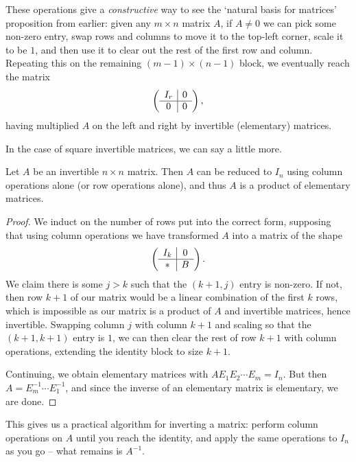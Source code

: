 \documentclass[a4paper]{scrartcl}
\begin{document}
These operations give a \emph{constructive} way to see the `natural basis for matrices' proposition from earlier: given any $m \times n$ matrix $A$, if $A \neq 0$ we can pick some non-zero entry, swap rows and columns to move it to the top-left corner, scale it to be $1$, and then use it to clear out the rest of the first row and column. Repeating this on the remaining $(m - 1) \times (n - 1)$ block, we eventually reach the matrix
$$
\left(\begin{array}{ c | c }
    I_r & 0 \\
    \hline
    0 & 0
  \end{array}\right),
$$
having multiplied $A$ on the left and right by invertible (elementary) matrices.

In the case of square invertible matrices, we can say a little more.

\begin{proposition}
    Let $A$ be an invertible $n \times n$ matrix. Then $A$ can be reduced to $I_n$ using column operations alone (or row operations alone), and thus $A$ is a product of elementary matrices.
\end{proposition}
\begin{proof}
    We induct on the number of rows put into the correct form, supposing that using column operations we have transformed $A$ into a matrix of the shape
    $$
    \left(\begin{array}{ c | c }
        I_k & 0 \\
        \hline
        * & B
      \end{array}\right).
    $$
    We claim there is some $j > k$ such that the $(k + 1, j)$ entry is non-zero. If not, then row $k+1$ of our matrix would be a linear combination of the first $k$ rows, which is impossible as our matrix is a product of $A$ and invertible matrices, hence invertible.
    Swapping column $j$ with column $k + 1$ and scaling so that the $(k+1, k+1)$ entry is $1$, we can then clear the rest of row $k + 1$ with column operations, extending the identity block to size $k + 1$.

    Continuing, we obtain elementary matrices with $A E_1 E_2 \cdots E_m = I_n$. But then $A = E_m^{-1} \cdots E_1^{-1}$, and since the inverse of an elementary matrix is elementary, we are done.
\end{proof}

This gives us a practical algorithm for inverting a matrix: perform column operations on $A$ until you reach the identity, and apply the same operations to $I_n$ as you go -- what remains is $A^{-1}$.
\end{document}

